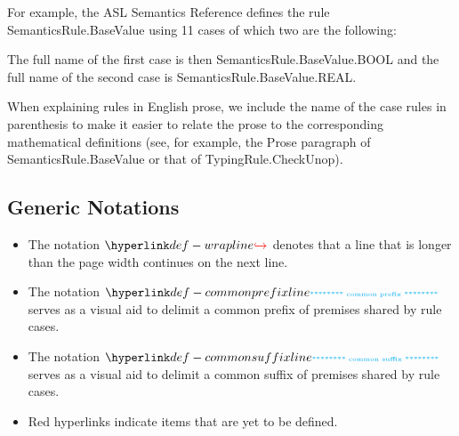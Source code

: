 For example, the ASL Semantics Reference defines the rule SemanticsRule.BaseValue using 11
cases of which two are the following:
The full name of the first case is then SemanticsRule.BaseValue.BOOL
and the full name of the second case is SemanticsRule.BaseValue.REAL.

When explaining rules in English prose, we include the name of the case rules
in parenthesis to make it easier to relate the prose to the corresponding mathematical
definitions (see, for example, the Prose paragraph of SemanticsRule.BaseValue
or that of TypingRule.CheckUnop).

\subsection{Generic Notations}
\hypertarget{def-wrapline}{}
\begin{itemize}
\item
The notation $\wrappedline$ denotes that a line that is longer than the page width continues on the next line.

\hypertarget{def-commonprefixline}{}
\item The notation $\commonprefixline$ serves as a visual aid to delimit a common prefix of premises shared by rule cases.

\hypertarget{def-commonsufffixline}{}
\item The notation $\commonsuffixline$ serves as a visual aid to delimit a common suffix of premises shared by rule cases.

\hypertarget{tododefine}{}
\item {} Red hyperlinks indicate items that are yet to be defined.
\end{itemize}
